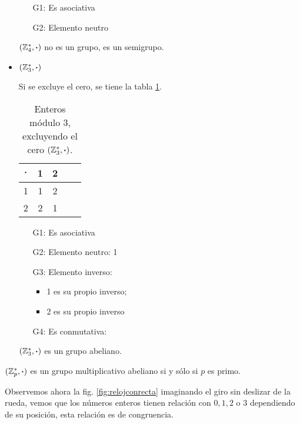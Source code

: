 \begin{itemize}
	\begin{itemize}
		\item[G1:] Es asociativa \cmark
		\item[G2:] Elemento neutro \xmark
	\end{itemize}
	
	\begin{center}
		$(\mathbb{Z}^{*}_4, \boldsymbol{\cdot})$ no es un grupo, es un semigrupo.
	\end{center}
	
	\item $(\mathbb{Z}^{*}_3, \boldsymbol{\cdot})$
	
	Si se excluye el cero, se tiene la tabla \ref{tab:mod3pa}.
	
	\begin{table}[H]
		\centering
		\begin{tabular}{c|cccc}
			$\boldsymbol{\cdot}$ & 1 & 2\\
			\hline
			1 & 1 & 2 \\
			2 & 2 & 1\\
		\end{tabular}
		\caption{Enteros módulo 3, excluyendo el cero $(\mathbb{Z}^{*}_3, \boldsymbol{\cdot})$.}
		\label{tab:mod3pa}
	\end{table}
	
	\begin{itemize}
		\item[G1:] Es asociativa \cmark
		\item[G2:] Elemento neutro: 1 \cmark
		\item[G3:] Elemento inverso: \cmark
		\begin{itemize}
			\item 1 es su propio inverso;
			\item 2 es su propio inverso
		\end{itemize}
		\item[G4:] Es conmutativa: \cmark
	\end{itemize}
	
	\begin{center}
		$(\mathbb{Z}^{*}_3, \boldsymbol{\cdot})$ es un grupo abeliano.
	\end{center}
\end{itemize}

\begin{proposition} \label{prop:primo}
	$(\mathbb{Z}_p^{*}, \boldsymbol{\cdot})$ es un grupo multiplicativo abeliano si y sólo si $p$ es primo.
\end{proposition}

Observemos ahora la fig. \ref{fig:relojconrecta} imaginando el giro sin deslizar de la rueda, vemos que los números enteros tienen relación con $0, 1, 2$ o $3$ dependiendo de su posición, esta relación es de congruencia.

